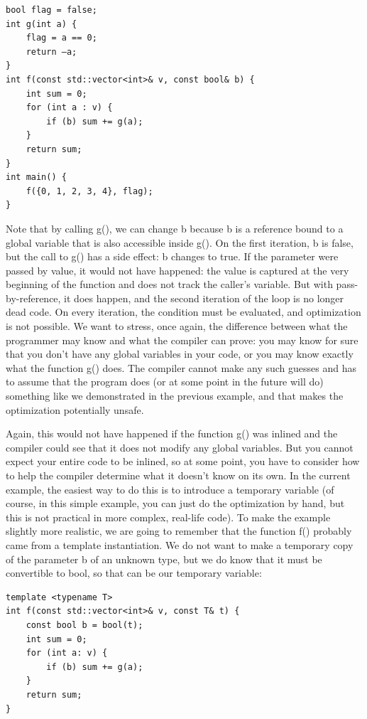 \begin{lstlisting}[style=styleCXX]
bool flag = false;
int g(int a) {
	flag = a == 0;
	return –a;
}
int f(const std::vector<int>& v, const bool& b) {
	int sum = 0;
	for (int a : v) {
		if (b) sum += g(a);
	}
	return sum;
} 
int main() {
	f({0, 1, 2, 3, 4}, flag);
}
\end{lstlisting}

Note that by calling g(), we can change b because b is a reference bound to a global variable that is also accessible inside g(). On the first iteration, b is false, but the call to g() has a side effect: b changes to true. If the parameter were passed by value, it would not have happened: the value is captured at the very beginning of the function and does not track the caller's variable. But with pass-by-reference, it does happen, and the second iteration of the loop is no longer dead code. On every iteration, the condition must be evaluated, and optimization is not possible. We want to stress, once again, the difference between what the programmer may know and what the compiler can prove: you may know for sure that you don't have any global variables in your code, or you may know exactly what the function g() does. The compiler cannot make any such guesses and has to assume that the program does (or at some point in the future will do) something like we demonstrated in the previous example, and that makes the optimization potentially unsafe. 

Again, this would not have happened if the function g() was inlined and the compiler could see that it does not modify any global variables. But you cannot expect your entire code to be inlined, so at some point, you have to consider how to help the compiler determine what it doesn't know on its own. In the current example, the easiest way to do this is to introduce a temporary variable (of course, in this simple example, you can just do the optimization by hand, but this is not practical in more complex, real-life code). To make the example slightly more realistic, we are going to remember that the function f() probably came from a template instantiation. We do not want to make a temporary copy of the parameter b of an unknown type, but we do know that it must be convertible to bool, so that can be our temporary variable:

\begin{lstlisting}[style=styleCXX]
template <typename T>
int f(const std::vector<int>& v, const T& t) {
	const bool b = bool(t);
	int sum = 0;
	for (int a: v) {
		if (b) sum += g(a);
	}
	return sum;
} 

\end{lstlisting}

